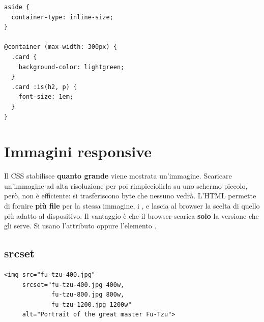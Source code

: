 \begin{affianco}[0.44][c]
\begin{lstlisting}[style=css, name=container.css]
aside {
  container-type: inline-size;
}

@container (max-width: 300px) {
  .card {
    background-color: lightgreen;
  }
  .card :is(h2, p) {
    font-size: 1em;
  }
}
\end{lstlisting}
\risultato
\begin{browser}
\end{browser}
\end{affianco}

\section{Immagini responsive}

Il CSS stabilisce \textbf{quanto grande} viene mostrata un'immagine. Scaricare
un'immagine ad alta risoluzione per poi rimpicciolirla su uno schermo piccolo,
però, non è efficiente: si trasferiscono byte che nessuno vedrà. L'HTML permette
di fornire \textbf{più file} per la stessa immagine, i , e
lascia al browser la scelta di quello più adatto al dispositivo. Il vantaggio è
che il browser scarica \textbf{solo} la versione che gli serve. Si usano
l'attributo  oppure l'elemento .

\subsection{srcset}

\begin{lstlisting}[style=html, name=srcset.html]
<img src="fu-tzu-400.jpg"
     srcset="fu-tzu-400.jpg 400w,
             fu-tzu-800.jpg 800w,
             fu-tzu-1200.jpg 1200w"
     alt="Portrait of the great master Fu-Tzu">
\end{lstlisting}

